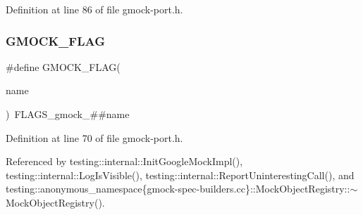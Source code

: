Definition at line 86 of file gmock-\/port.\+h.

\mbox{\label{gmock-port_8h_ad7119adfef06be5e7b1551633f5a1436}} 
\subsubsection{\texorpdfstring{G\+M\+O\+C\+K\+\_\+\+F\+L\+AG}{GMOCK\_FLAG}}
{\footnotesize\ttfamily \#define G\+M\+O\+C\+K\+\_\+\+F\+L\+AG(\begin{DoxyParamCaption}\item[{}]{name }\end{DoxyParamCaption})~F\+L\+A\+G\+S\+\_\+gmock\+\_\+\#\#name}



Definition at line 70 of file gmock-\/port.\+h.



Referenced by testing\+::internal\+::\+Init\+Google\+Mock\+Impl(), testing\+::internal\+::\+Log\+Is\+Visible(), testing\+::internal\+::\+Report\+Uninteresting\+Call(), and testing\+::anonymous\+\_\+namespace\{gmock-\/spec-\/builders.\+cc\}\+::\+Mock\+Object\+Registry\+::$\sim$\+Mock\+Object\+Registry().

